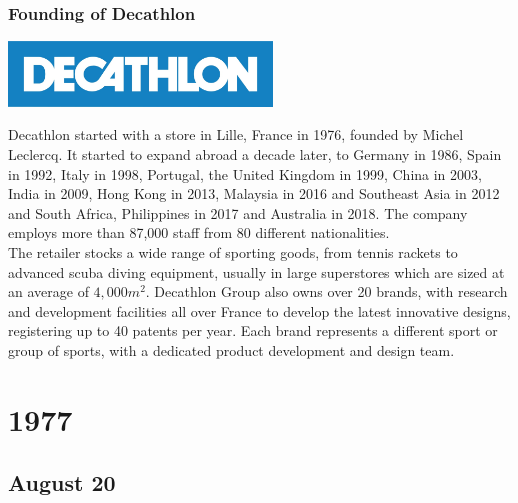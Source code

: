 \documentclass[11pt]{report}
\begin{document}
\subsection{Founding of Decathlon}
\vspace{2mm}\begin{center}\includegraphics[width=7cm]{./img/decathlonLogo.jpg}\end{center}
Decathlon started with a store in Lille, France in 1976, founded by Michel Leclercq. It started to expand abroad a decade later, to Germany in 1986, Spain in 1992, Italy in 1998, Portugal, the United Kingdom in 1999, China in 2003, India in 2009, Hong Kong in 2013, Malaysia in 2016 and Southeast Asia in 2012 and South Africa, Philippines in 2017 and Australia in 2018. The company employs more than 87,000 staff from 80 different nationalities.\\ \indent The retailer stocks a wide range of sporting goods, from tennis rackets to advanced scuba diving equipment, usually in large superstores which are sized at an average of $4,000m^{2}$. Decathlon Group also owns over 20 brands, with research and development facilities all over France to develop the latest innovative designs, registering up to 40 patents per year. Each brand represents a different sport or group of sports, with a dedicated product development and design team.

\chapter{1977}
\section{August 20}
\end{document}
